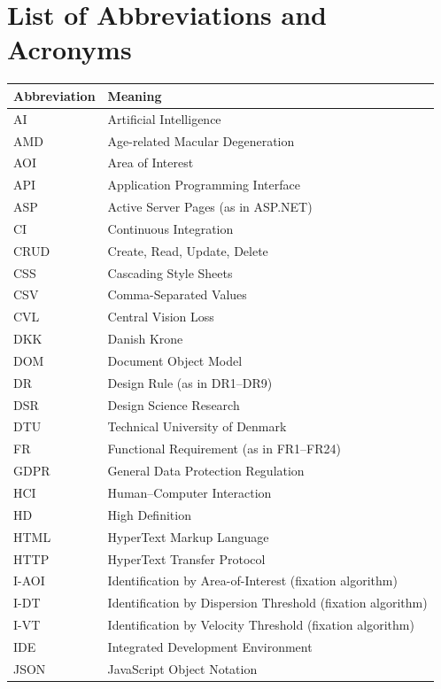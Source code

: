 \chapter*{List of Abbreviations and Acronyms}

\begin{longtable}{@{}p{3cm}p{11cm}@{}}
\textbf{Abbreviation} & \textbf{Meaning} \\[4pt]
\endhead

AI    & Artificial Intelligence \\
AMD   & Age-related Macular Degeneration \\
AOI   & Area of Interest \\
API   & Application Programming Interface \\
ASP   & Active Server Pages (as in ASP.NET) \\
CI    & Continuous Integration \\
CRUD  & Create, Read, Update, Delete \\
CSS   & Cascading Style Sheets \\
CSV   & Comma-Separated Values \\
CVL   & Central Vision Loss \\
DKK   & Danish Krone \\
DOM   & Document Object Model \\
DR    & Design Rule (as in DR1--DR9) \\
DSR   & Design Science Research \\
DTU   & Technical University of Denmark \\
FR    & Functional Requirement (as in FR1--FR24) \\
GDPR  & General Data Protection Regulation \\
HCI   & Human--Computer Interaction \\
HD    & High Definition \\
HTML  & HyperText Markup Language \\
HTTP  & HyperText Transfer Protocol \\
I-AOI & Identification by Area-of-Interest (fixation algorithm) \\
I-DT  & Identification by Dispersion Threshold (fixation algorithm) \\
I-VT  & Identification by Velocity Threshold (fixation algorithm) \\
IDE   & Integrated Development Environment \\
JSON  & JavaScript Object Notation \\

\end{longtable}
